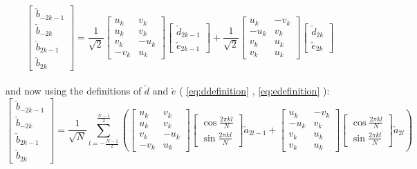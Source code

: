 \documentclass[12pt,a4paper]{book}
\theoremstyle{definition}
\begin{document}
\begin{equation}\label{eq:orthogonaevenodd}\left[\begin{array}{c}
		\check{b}_{-2 k-1} \\
		\check{b}_{-2 k} \\
		\check{b}_{2 k-1} \\
		\check{b}_{2 k}
	\end{array}\right]=\frac{1}{\sqrt{2}}\left[\begin{array}{cc}
		u_{k} & v_{k}  \\
		u_{k} & v_{k}  \\
		v_{k} & -u_{k} \\
		-v_{k} & u_{k} 
	\end{array}\right]\left[\begin{array}{c}
		\check{d}_{2 k-1} \\
		\check{e}_{2 k-1} 
	\end{array}\right]+\frac{1}{\sqrt{2}}\left[\begin{array}{cc}
		u_{k} & -v_{k}  \\
		-u_{k} & v_{k}  \\
		v_{k} & u_{k} \\
		v_{k} & u_{k} 
	\end{array}\right]\left[\begin{array}{c}
		\check{d}_{2 k} \\
		\check{e}_{2 k} 
	\end{array}\right]\end{equation}\\
and now using the definitions of $\check{d}$ and $\check{e}$ ( \ref{eq:ddefinition} , \ref{eq:edefinition} ):
\begin{equation}\label{eq:orthogonalba}\left[\begin{array}{c}
		\check{b}_{-2 k-1} \\
		\check{b}_{-2 k} \\
		\check{b}_{2 k-1} \\
		\check{b}_{2 k}
	\end{array}\right]=\frac{1}{\sqrt{N}}\sum_{l=-\frac{N-1}{2}}^{\frac{N-1}{2}}\left(\left[\begin{array}{cc}
		u_{k} & v_{k}  \\
		u_{k} & v_{k}  \\
		v_{k} & -u_{k} \\
		-v_{k} & u_{k} 
	\end{array}\right]\left[\begin{array}{c}
		\cos \frac{2 \pi k l}{N}  \\
		\sin \frac{2 \pi k l}{N}  
	\end{array}\right]\check{a}_{2l-1}+
	\left[\begin{array}{cc}
		u_{k} & -v_{k}  \\
		-u_{k} & v_{k}  \\
		v_{k} & u_{k} \\
		v_{k} & u_{k} 
	\end{array}\right]\left[\begin{array}{c}
		\cos \frac{2 \pi k l}{N}  \\
		\sin \frac{2 \pi k l}{N}  
	\end{array}\right]\check{a}_{2l}\right) \end{equation}
\end{document}
